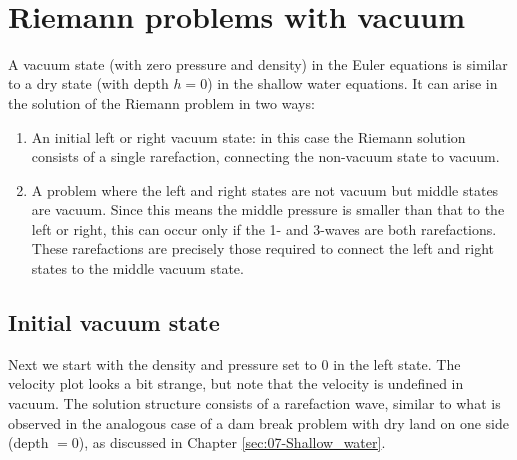 \documentclass{SIAMbook2016}
\providecommand{\tightlist}{%
      \setlength{\itemsep}{0pt}\setlength{\parskip}{0pt}}
\begin{document}
    \begin{center}
    \end{center}
    { \hspace*{\fill} \\}
    
\hypertarget{riemann-problems-with-vacuum}{%
\section{Riemann problems with
vacuum}\label{riemann-problems-with-vacuum}}

A vacuum state (with zero pressure and density) in the Euler equations
is similar to a dry state (with depth \(h=0\)) in the shallow water
equations. It can arise in the solution of the Riemann problem in two
ways:

\begin{enumerate}
\def\labelenumi{\arabic{enumi}.}
\tightlist
\item
  An initial left or right vacuum state: in this case the Riemann
  solution consists of a single rarefaction, connecting the non-vacuum
  state to vacuum.
\item
  A problem where the left and right states are not vacuum but middle
  states are vacuum. Since this means the middle pressure is smaller
  than that to the left or right, this can occur only if the 1- and
  3-waves are both rarefactions. These rarefactions are precisely those
  required to connect the left and right states to the middle vacuum
  state.
\end{enumerate}

\hypertarget{initial-vacuum-state}{%
\subsection{Initial vacuum state}\label{initial-vacuum-state}}

Next we start with the density and pressure set to 0 in the left state.
The velocity plot looks a bit strange, but note that the velocity is
undefined in vacuum. The solution structure consists of a rarefaction
wave, similar to what is observed in the analogous case of a dam break
problem with dry land on one side (depth \(=0\)), as discussed in
Chapter \ref{sec:07-Shallow_water}.
\end{document}
